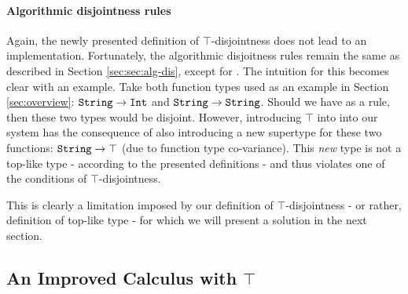 


\paragraph{Algorithmic disjointness rules}

Again, the newly presented definition of $\top$-disjointness does not lead to an implementation. 
Fortunately, the algorithmic disjoitness rules remain the same as described in Section \ref{sec:sec:alg-dis}, 
except for .
The intuition for this becomes clear with an example.
Take both function types used as an example in Section \ref{sec:overview}: 
$\texttt{String} \to \texttt{Int}$ and $\texttt{String} \to \texttt{String}$. 
Should we have  as a rule, then these two types would be disjoint. 
However, introducing $\top$ into into our system has the consequence of also introducing a new supertype for these 
two functions: $\texttt{String} \to \top$ (due to function type co-variance). 
This \emph{new} type is not a top-like type - according to the presented definitions - and thus violates one of the
conditions of $\top$-disjointness.

This is clearly a limitation imposed by our definition of $\top$-disjointness - or rather, definition of top-like type - 
for which we will present a solution in the next section.

\subsection{An Improved Calculus with $\top$}


